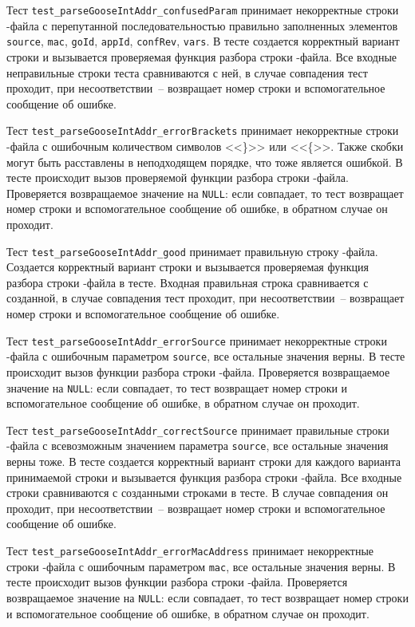 Тест \lstinline{test_parseGooseIntAddr_confusedParam} принимает некорректные строки \cid-файла с перепутанной последовательностью правильно заполненных элементов \lstinline{source}, \lstinline{mac}, \lstinline{goId}, \lstinline{appId}, \lstinline{confRev}, \lstinline{vars}. В тесте создается корректный вариант строки и вызывается проверяемая функция разбора строки \cid-файла. Все входные неправильные строки теста сравниваются с ней, в случае совпадения тест проходит, при несоответствии~-- возвращает номер строки и вспомогательное сообщение  об ошибке.

Тест \lstinline{test_parseGooseIntAddr_errorBrackets} принимает некорректные строки \cid-файла с ошибочным количеством символов <<\}>> или <<\{>>. Также скобки могут быть расставлены в неподходящем порядке, что тоже является ошибкой. В тесте происходит вызов проверяемой функции разбора строки \cid-файла. Проверяется возвращаемое значение на \lstinline{NULL}: если совпадает, то тест возвращает номер строки и вспомогательное сообщение об ошибке, в обратном случае он проходит.

Тест \lstinline{test_parseGooseIntAddr_good} принимает правильную строку \cid-файла. Создается корректный вариант строки и вызывается проверяемая функция разбора строки \cid-файла в тесте. Входная правильная строка сравнивается с созданной, в случае совпадения тест проходит, при несоответствии~-- возвращает номер строки и вспомогательное сообщение  об ошибке.

Тест \lstinline{test_parseGooseIntAddr_errorSource} принимает некорректные строки \cid-файла с ошибочным параметром \lstinline{source}, все остальные значения верны. В тесте происходит вызов функции разбора строки \cid-файла. Проверяется возвращаемое значение на \lstinline{NULL}: если совпадает, то тест возвращает номер строки и вспомогательное сообщение об ошибке, в обратном случае он проходит.

Тест \lstinline{test_parseGooseIntAddr_correctSource} принимает правильные строки \cid-файла с всевозможным значением параметра \lstinline{source}, все остальные значения верны тоже. В тесте создается корректный вариант строки для каждого варианта принимаемой строки и вызывается функция разбора строки \cid-файла. Все входные строки сравниваются с созданными строками в тесте. В случае совпадения он проходит, при несоответствии~-- возвращает номер строки и вспомогательное сообщение  об ошибке.

Тест \lstinline{test_parseGooseIntAddr_errorMacAddress} принимает некорректные строки \cid-файла с ошибочным параметром \lstinline{mac}, все остальные значения верны. В тесте происходит вызов функции разбора строки \cid-файла. Проверяется возвращаемое значение на \lstinline{NULL}: если совпадает, то тест возвращает номер строки и вспомогательное сообщение об ошибке, в обратном случае он проходит.

